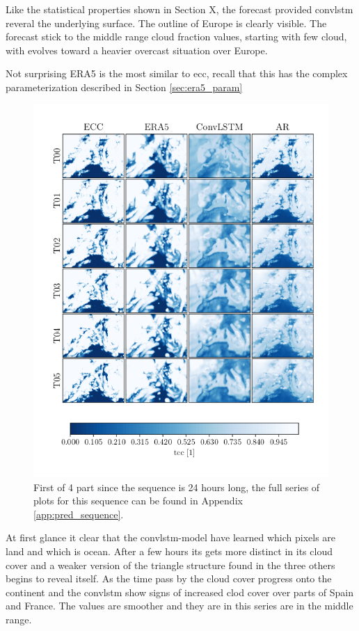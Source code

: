 Like the statistical properties shown in Section X, the forecast provided \acrshort{convlstm} reveral the underlying surface. The outline of Europe is clearly visible. The forecast stick to the middle range cloud fraction values, starting with few cloud, with evolves toward a heavier overcast situation over Europe. 

Not surprising ERA5 is the most similar to \acrshort{ecc}, recall that this has the complex parameterization described in Section \ref{sec:era5_param}


\begin{figure}[ht]
    \centering
    \includegraphics[sale=0.1]{python_figs/comparting_seq_part_1_of4.png}
    \caption{First of 4 part since the sequence is 24 hours long, the full series of plots for this sequence can be found in Appendix \ref{app:pred_sequence}.}
    \label{fig:pred_sequence}
\end{figure}
At first glance it clear that the \acrshort{convlstm}-model have learned which pixels are land and which is ocean. After a few hours its gets more distinct in its cloud cover and a weaker version of the triangle structure found in the three others begins to reveal itself. As the time pass by the cloud cover progress onto the continent and the \acrshort{convlstm} show signs of increased clod cover over parts of Spain and France.
The values are smoother and they are in this series are in the middle range.

